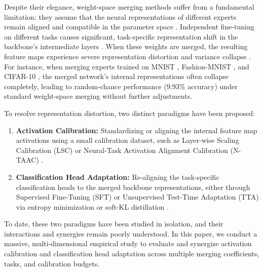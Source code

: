 \documentclass{article}
\theoremstyle{plain}
\theoremstyle{definition}
\theoremstyle{remark}
\begin{document}
Despite their elegance, weight-space merging methods suffer from a fundamental limitation: they assume that the neural representations of different experts remain aligned and compatible in the parameter space \cite{choshen2022fusing, ainsworth2022git}. Independent fine-tuning on different tasks causes significant, task-specific representation shift in the backbone's intermediate layers \cite{kornblith2019similarity, raghu2017svcca, morcos2018insights}. When these weights are merged, the resulting feature maps experience severe representation distortion and variance collapse \cite{pan2024unveiling, zhang2024comprehensive}. For instance, when merging experts trained on MNIST \cite{lecun1998gradient}, Fashion-MNIST \cite{xiao2017fashion}, and CIFAR-10 \cite{krizhevsky2009learning}, the merged network's internal representations often collapse completely, leading to random-chance performance (9.93\% accuracy) under standard weight-space merging without further adjustments.

To resolve representation distortion, two distinct paradigms have been proposed:
\begin{enumerate}
    \item \textbf{Activation Calibration:} Standardizing or aligning the internal feature map activations using a small calibration dataset, such as Layer-wise Scaling Calibration (LSC) \cite{choshen2022fusing} or Neural-Task Activation Alignment Calibration (N-TAAC) \cite{luping2024concrete}.
    \item \textbf{Classification Head Adaptation:} Re-aligning the task-specific classification heads to the merged backbone representations, either through Supervised Fine-Tuning (SFT) \cite{liang2020we} or Unsupervised Test-Time Adaptation (TTA) via entropy minimization or soft-KL distillation \cite{wang2021tent, wang2023comprehensive}.
\end{enumerate}

To date, these two paradigms have been studied in isolation, and their interactions and synergies remain poorly understood. In this paper, we conduct a massive, multi-dimensional empirical study to evaluate and synergize activation calibration and classification head adaptation across multiple merging coefficients, tasks, and calibration budgets. 
\end{document}
